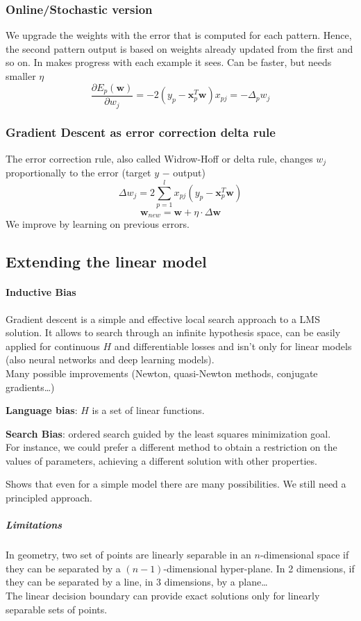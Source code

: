 \documentclass[10pt]{report}
\begin{document}
\subsubsection{Online/Stochastic version} We upgrade the weights with the error that is computed for each pattern. Hence, the second pattern output is based on weights already updated from the first and so on. In makes progress with each example it sees. Can be faster, but needs smaller $\eta$
$$\frac{\partial E_p(\mathbf{w})}{\partial w_j} = -2(y_p - \mathbf{x}_p^T \mathbf{w})x_{pj} = -\Delta_p w_j$$
\subsubsection{Gradient Descent as error correction delta rule} The error correction rule, also called Widrow-Hoff or delta rule, changes $w_j$ proportionally to the error (target $y$ $-$ output)
$$\Delta w_j = 2 \sum_{p=1}^l x_{pj} (y_p - \mathbf{x}_p^T \mathbf{w})$$
$$\mathbf{w}_{new} = \mathbf{w} + \eta\cdot\Delta \mathbf{w}$$
We improve by learning on previous errors.
\subsection{Extending the linear model}
\paragraph{Inductive Bias}
Gradient descent is a simple and effective local search approach to a LMS solution. It allows to search through an infinite hypothesis space, can be easily applied for continuous $H$ and differentiable losses and isn't only for linear models (also neural networks and deep learning models).\\
Many possible improvements (Newton, quasi-Newton methods, conjugate gradients\ldots)
\begin{list}{}{}
	\item \textbf{Language bias}: $H$ is a set of linear functions.
	\item \textbf{Search Bias}: ordered search guided by the least squares minimization goal.\\
	For instance, we could prefer a different method to obtain a restriction on the values of parameters, achieving a different solution with other properties.
\end{list}
Shows that even for a simple model there are many possibilities. We still need a principled approach.
\subparagraph{Limitations} In geometry, two set of points are linearly separable in an $n$-dimensional space if they can be separated by a $(n-1)$-dimensional hyper-plane. In 2 dimensions, if they can be separated by a line, in 3 dimensions, by a plane\ldots\\
The linear decision boundary can provide exact solutions only for linearly separable sets of points.
\end{document}
